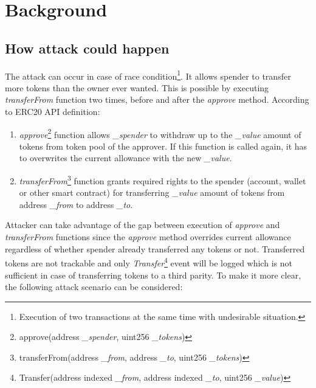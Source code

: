 
\section{Background}
\subsection{How attack could happen}
The attack can occur in case of race condition\footnote{Execution of two transactions at the same time with undesirable situation.}. It allows spender to transfer more tokens than the owner ever wanted. This is possible by executing \textit{transferFrom} function two times, before and after the \textit{approve} method. According to ERC20 API definition:
\begin{enumerate}[label=(\alph*)]
	\item \textit{approve}\footnote{approve(address \textit{\_spender}, uint256 \textit{\_tokens})} function allows \textit{\_spender} to withdraw up to the \textit{\_value} amount of tokens from token pool of the approver. If this function is called again, it has to overwrites the current allowance with the new \textit{\_value}.
	\item \textit{transferFrom}\footnote{transferFrom(address \textit{\_from}, address \textit{\_to}, uint256 \textit{\_tokens})} function grants required rights to the spender (account, wallet or other smart contract) for transferring \textit{\_value} amount of tokens from address \textit{\_from} to address \textit{\_to}.
\end{enumerate}
Attacker can take advantage of the gap between execution of \textit{approve} and \textit{transferFrom} functions since the \textit{approve} method overrides current allowance regardless of whether spender already transferred any tokens or not. Transferred tokens are not trackable and only \textit{Transfer}\footnote{Transfer(address indexed \textit{\_from}, address indexed \textit{\_to}, uint256 \textit{\_value})} event will be logged which is not sufficient in case of transferring tokens to a third parity. To make it more clear, the following attack scenario can be considered:
